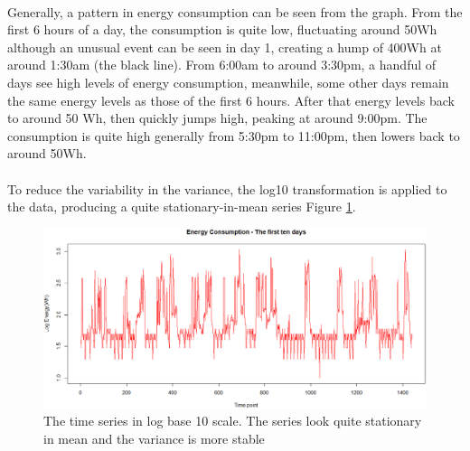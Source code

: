 \documentclass[12pt]{article}
\begin{document}
\paragraph{}
Generally, a pattern in energy consumption can be seen from the graph. From the first 6 hours of a day, the consumption is quite low, fluctuating around 50Wh although an unusual event can be seen in day 1, creating a hump of 400Wh at around 1:30am (the black line). From 6:00am to around 3:30pm, a handful of days see high levels of energy consumption, meanwhile, some other days remain the same energy levels as those of the first 6 hours. After that energy levels back to around 50 Wh, then quickly jumps high, peaking at around 9:00pm. The consumption is quite high generally from 5:30pm to 11:00pm, then lowers back to around 50Wh.

\paragraph{}
To reduce the variability in the variance, the log10 transformation is  applied to the data, producing a quite stationary-in-mean series Figure \ref{fig:figure4}.
\begin{figure}[H]
  \includegraphics[width=\linewidth]{figure4.png}
  \caption{The time series in log base 10 scale. The series look quite stationary in mean and the variance is more stable}
  \label{fig:figure4}
\end{figure}
\end{document}
